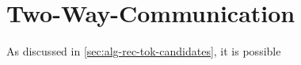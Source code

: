 \chapter{Two-Way-Communication}

As discussed in \autoref{sec:alg-rec-tok-candidates}, it is possible 
